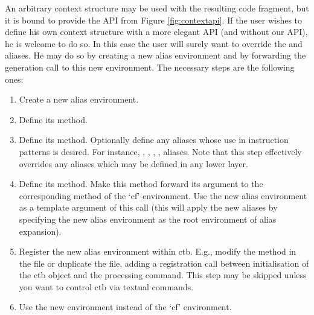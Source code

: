 An arbitrary context structure may be used with the resulting code fragment, but it is bound to provide the API from Figure \ref{fig:contextapi}. If the user wishes to define his own context structure with a more elegant API (and without our API), he is welcome to do so. In this case the user will surely want to override the  and  aliases. He may do so by creating a new alias environment and by forwarding the generation call to this new environment. The necessary steps are the following ones:
\begin{enumerate}
  \item Create a new alias environment.
  \item Define its  method.
  \item Define its  method. Optionally define any aliases whose use in instruction patterns is desired. For instance, , , , ,  aliases. Note that this step effectively overrides any aliases which may be defined in any lower layer. 
  \item Define its  method. Make this method forward its argument to the corresponding method of the `cf' environment. Use the new alias environment as a template argument of this call (this will apply the new aliases by specifying the new alias environment as the root environment of alias expansion).
  \item Register the new alias environment within ctb. E.g., modify the  method in the  file or duplicate the  file, adding a registration call between initialisation of the ctb object and the processing command. This step may be skipped unless you want to control ctb via textual commands.
  \item Use the new environment instead of the `cf' environment.
\end{enumerate}



